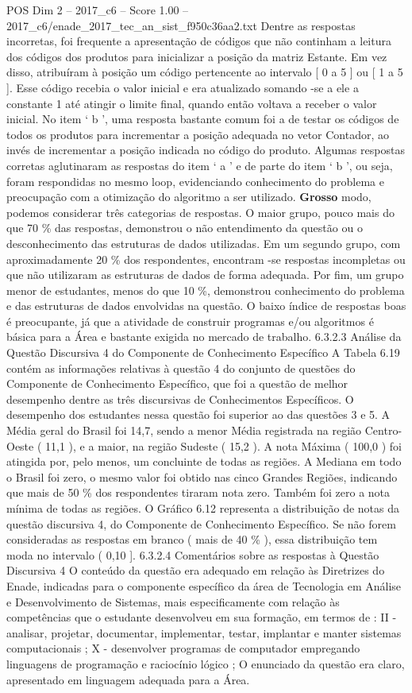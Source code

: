 \begin{textsample}{POS Dim 2 – 2017\_c6 – Score 1.00 – 2017\_c6/enade\_2017\_tec\_an\_sist\_f950c36aa2.txt}
Dentre as respostas incorretas, foi frequente a apresentação de códigos que não continham a leitura dos códigos dos produtos para inicializar a posição da matriz Estante.
Em vez disso, atribuíram à posição um código pertencente ao intervalo [ 0 a 5 ] ou [ 1 a 5 ].
Esse código recebia o valor inicial e era atualizado somando -se a ele a constante 1 até atingir o limite final, quando então voltava a receber o valor inicial.
No item ‘ b ’, uma resposta bastante comum foi a de testar os códigos de todos os produtos para incrementar a posição adequada no vetor Contador, ao invés de incrementar a posição indicada no código do produto.
Algumas respostas corretas aglutinaram as respostas do item ‘ a ’ e de parte do item ‘ b ’, ou seja, foram respondidas no mesmo loop, evidenciando conhecimento do problema e preocupação com a otimização do algoritmo a ser utilizado. \textbf{Grosso} modo, podemos considerar três categorias de respostas.
O maior grupo, pouco mais do que 70 \% das respostas, demonstrou o não entendimento da questão ou o desconhecimento das estruturas de dados utilizadas.
Em um segundo grupo, com aproximadamente 20 \% dos respondentes, encontram -se respostas incompletas ou que não utilizaram as estruturas de dados de forma adequada.
Por fim, um grupo menor de estudantes, menos do que 10 \%, demonstrou conhecimento do problema e das estruturas de dados envolvidas na questão.
O baixo índice de respostas boas é preocupante, já que a atividade de construir programas e/ou algoritmos é básica para a Área e bastante exigida no mercado de trabalho. 6.3.2.3 Análise da Questão Discursiva 4 do Componente de Conhecimento Específico A Tabela 6.19 contém as informações relativas à questão 4 do conjunto de questões do Componente de Conhecimento Específico, que foi a questão de melhor desempenho dentre as três discursivas de Conhecimentos Específicos.
O desempenho dos estudantes nessa questão foi superior ao das questões 3 e 5.
A Média geral do Brasil foi 14,7, sendo a menor Média registrada na região Centro-Oeste ( 11,1 ), e a maior, na região Sudeste ( 15,2 ).
A nota Máxima ( 100,0 ) foi atingida por, pelo menos, um concluinte de todas as regiões.
A Mediana em todo o Brasil foi zero, o mesmo valor foi obtido nas cinco Grandes Regiões, indicando que mais de 50 \% dos respondentes tiraram nota zero.
Também foi zero a nota mínima de todas as regiões.
O Gráfico 6.12 representa a distribuição de notas da questão discursiva 4, do Componente de Conhecimento Específico.
Se não forem consideradas as respostas em branco ( mais de 40 \% ), essa distribuição tem moda no intervalo ( 0,10 ]. 6.3.2.4 Comentários sobre as respostas à Questão Discursiva 4 O conteúdo da questão era adequado em relação às Diretrizes do Enade, indicadas para o componente específico da área de Tecnologia em Análise e Desenvolvimento de Sistemas, mais especificamente com relação às competências que o estudante desenvolveu em sua formação, em termos de : II - analisar, projetar, documentar, implementar, testar, implantar e manter sistemas computacionais ; X - desenvolver programas de computador empregando linguagens de programação e raciocínio lógico ; O enunciado da questão era claro, apresentado em linguagem adequada para a Área.

\end{textsample}
